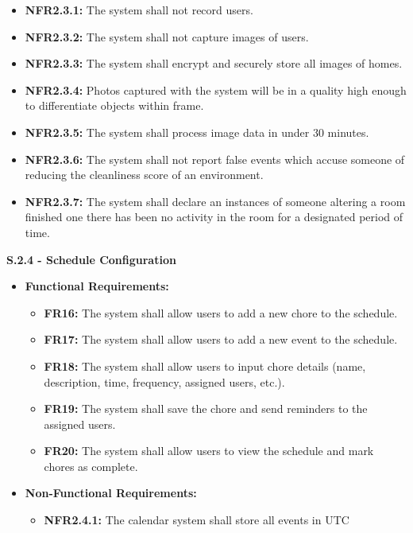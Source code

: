 \documentclass{scrreprt}
\theoremstyle{definition}
\begin{document}
\begin{flushleft}
\begin{itemize}
  		\begin{itemize}
  			\item \textbf{NFR2.3.1:} The system shall not record users.
  			\item \textbf{NFR2.3.2:} The system shall not capture images of users.
  			\item \textbf{NFR2.3.3:} The system shall encrypt and securely store all images of homes.
  			\item \textbf{NFR2.3.4:} Photos captured with the system will be in a quality high enough to differentiate objects within frame.
  			\item \textbf{NFR2.3.5:} The system shall process image data in under 30 minutes.
  			\item \textbf{NFR2.3.6:} The system shall not report false events which accuse someone of reducing the cleanliness score of an environment.
  			\item \textbf{NFR2.3.7:} The system shall declare an instances of someone altering a room finished one there has been no activity in the room for a designated period of time.
  		\end{itemize}
  	\end{itemize}
  	\item \textbf{S.2.4 - Schedule Configuration}
  	\begin{itemize}
  		\item \textbf{Functional Requirements:}
  		\begin{itemize}
  			\item \textbf{FR16:} The system shall allow users to add a new chore to the schedule.
            \item \textbf{FR17:} The system shall allow users to add a new event to the schedule.
            \item \textbf{FR18:} The system shall allow users to input chore details (name, description, time, frequency, assigned users, etc.).
            \item \textbf{FR19:} The system shall save the chore and send reminders to the assigned users.
            \item \textbf{FR20:} The system shall allow users to view the schedule and mark chores as complete.
  		\end{itemize}
  		\item \textbf{Non-Functional Requirements:}
  		\begin{itemize}
  			\item \textbf{NFR2.4.1:} The calendar system shall store all events in UTC

\end{itemize}
\end{itemize}
\end{flushleft}
\end{document}
